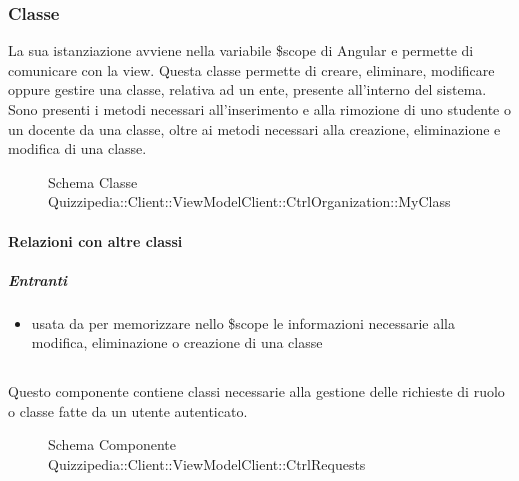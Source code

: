 \subsubsection{Classe }
La sua istanziazione avviene nella variabile \$scope di Angular e permette di comunicare con la view. Questa classe permette di creare, eliminare, modificare oppure gestire una classe, relativa ad un ente, presente all'interno del sistema.
Sono presenti i metodi necessari all'inserimento e alla rimozione di uno studente o un docente da una classe, oltre ai metodi necessari alla creazione, eliminazione e modifica di una classe.
\begin{figure}[H]
\centering
\noindent{}
\caption[Schema Classe MyClass]{Schema Classe Quizzipedia::Client::ViewModelClient::CtrlOrganization::MyClass}
\end{figure}
\paragraph{Relazioni con altre classi}
\subparagraph{Entranti}
\begin{itemize}
\item usata da  per memorizzare nello \$scope le informazioni necessarie alla modifica, eliminazione o creazione di una classe
\end{itemize}
\subsection{}
Questo componente contiene classi necessarie alla gestione delle richieste di ruolo o classe fatte da un utente autenticato.
\begin{figure}[H]
\centering
\noindent{}
\caption[Schema Componente Quizzipedia::Client::ViewModelClient::CtrlRequests]{Schema Componente Quizzipedia::Client::ViewModelClient::CtrlRequests}
\end{figure}
